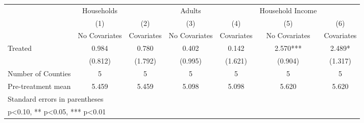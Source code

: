 {
\def\sym#1{\ifmmode^{#1}\else\(^{#1}\)\fi}
\begin{tabular}{l*{6}{c}}
\hline\hline
            &  Households   &               &      Adults   &               &Household Income   &               \\
            &\multicolumn{1}{c}{(1)}&\multicolumn{1}{c}{(2)}&\multicolumn{1}{c}{(3)}&\multicolumn{1}{c}{(4)}&\multicolumn{1}{c}{(5)}&\multicolumn{1}{c}{(6)}\\
            &\multicolumn{1}{c}{No Covariates}&\multicolumn{1}{c}{Covariates}&\multicolumn{1}{c}{No Covariates}&\multicolumn{1}{c}{Covariates}&\multicolumn{1}{c}{No Covariates}&\multicolumn{1}{c}{Covariates}\\
\hline
Treated     &       0.984   &       0.780   &       0.402   &       0.142   &       2.570***&       2.489*  \\
            &     (0.812)   &     (1.792)   &     (0.995)   &     (1.621)   &     (0.904)   &     (1.317)   \\
\hline
Number of Counties&           5   &           5   &           5   &           5   &           5   &           5   \\
Pre-treatment mean&       5.459   &       5.459   &       5.098   &       5.098   &       5.620   &       5.620   \\
\hline\hline
\multicolumn{7}{l}{\footnotesize Standard errors in parentheses}\\
\multicolumn{7}{l}{\footnotesize * p<0.10, ** p<0.05, *** p<0.01}\\
\end{tabular}
}

